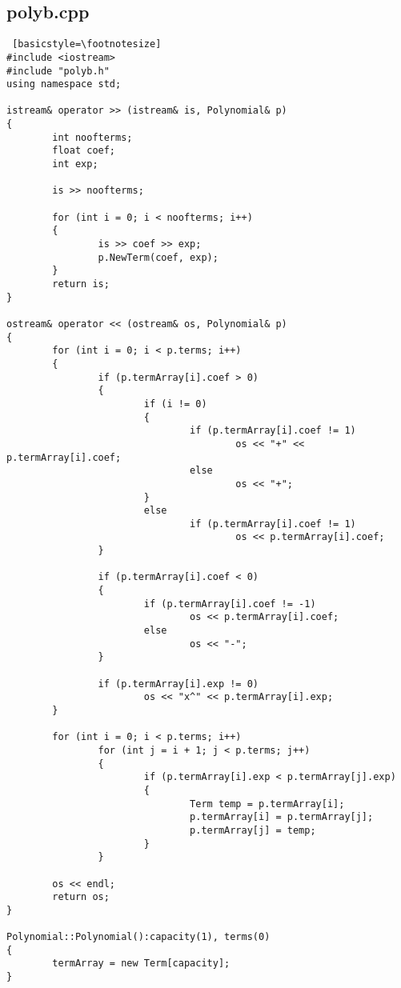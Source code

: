 \documentclass[twoside,twocolumn]{article}
\begin{document}
\subsection{polyb.cpp}
\begin{lstlisting} [basicstyle=\footnotesize]
#include <iostream>
#include "polyb.h"
using namespace std;

istream& operator >> (istream& is, Polynomial& p)
{
        int noofterms;
        float coef;
        int exp;

        is >> noofterms;

        for (int i = 0; i < noofterms; i++)
        {
                is >> coef >> exp;
                p.NewTerm(coef, exp);
        }
        return is;
}

ostream& operator << (ostream& os, Polynomial& p)
{
        for (int i = 0; i < p.terms; i++)
        {
                if (p.termArray[i].coef > 0)
                {
                        if (i != 0)
                        {
                                if (p.termArray[i].coef != 1)
                                        os << "+" << p.termArray[i].coef;
                                else
                                        os << "+";
                        }
                        else
                                if (p.termArray[i].coef != 1)
                                        os << p.termArray[i].coef;
                }

                if (p.termArray[i].coef < 0)
                {
                        if (p.termArray[i].coef != -1)
                                os << p.termArray[i].coef;
                        else
                                os << "-";
                }

                if (p.termArray[i].exp != 0)
                        os << "x^" << p.termArray[i].exp;
        }

        for (int i = 0; i < p.terms; i++)
                for (int j = i + 1; j < p.terms; j++)
                {
                        if (p.termArray[i].exp < p.termArray[j].exp)
                        {
                                Term temp = p.termArray[i];
                                p.termArray[i] = p.termArray[j];
                                p.termArray[j] = temp;
                        }
                }

        os << endl;
        return os;
}

Polynomial::Polynomial():capacity(1), terms(0)
{
        termArray = new Term[capacity];
}


\end{lstlisting}
\end{document}
